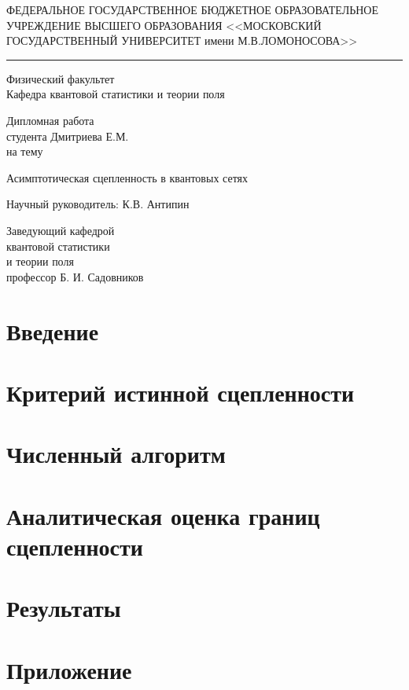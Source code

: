 \documentclass[a4paper,14pt,russian]{extreport}		%
\newcommand{\HRule}{\rule{\linewidth}{0.2mm}} 	%
\begin{document}
\begin{center}			
{\small ФЕДЕРАЛЬНОЕ ГОСУДАРСТВЕННОЕ БЮДЖЕТНОЕ ОБРАЗОВАТЕЛЬНОЕ УЧРЕЖДЕНИЕ ВЫСШЕГО ОБРАЗОВАНИЯ <<МОСКОВСКИЙ ГОСУДАРСТВЕННЫЙ УНИВЕРСИТЕТ имени М.В.ЛОМОНОСОВА>>}
\end{center}
\vspace*{-1cm}
\begin{center}
\HRule
\end{center}

\begin{center}
Физический факультет\\Кафедра квантовой статистики и теории поля\\[5cm]
\end{center}

\begin{center}
Дипломная работа\\студента Дмитриева Е.М.\\
на тему
\end{center}

\begin{center}
Асимптотическая сцепленность в квантовых сетях\\[6.6cm]
\end{center}

\begin{flushright}		
Научный руководитель: К.В. Антипин
\end{flushright}

\begin{flushleft}		
Заведующий кафедрой\\ квантовой статистики\\и теории поля\\профессор Б. И. Садовников
\end{flushleft}

\thispagestyle{empty}	%
\tableofcontents		%

\chapter{Введение}


\chapter{Критерий истинной сцепленности}


\chapter{Численный алгоритм}


\chapter{Аналитическая оценка границ сцепленности}


\chapter{Результаты}


\chapter{Приложение}


\printbibliography %
\end{document}
